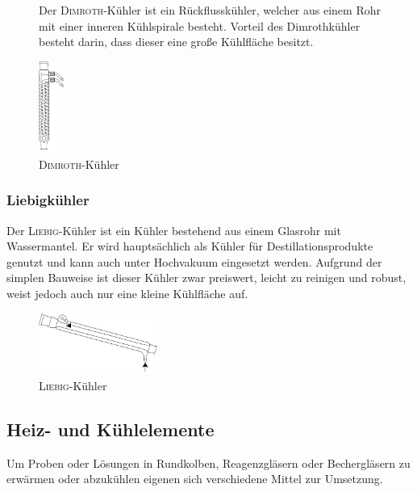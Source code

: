 \begin{figure}[h!]
	\begin{minipage}[t]{0.6\textwidth}
		\vspace{0pt}
		Der \textsc{Dimroth}-Kühler ist ein Rückflusskühler, welcher aus einem Rohr mit einer inneren Kühlspirale besteht. Vorteil des Dimrothkühler besteht darin, dass dieser eine große Kühlfläche besitzt.
	\end{minipage}
	\hfill
	\begin{minipage}[t]{0.35\textwidth}
		\vspace{0pt}
		\centering
		\includegraphics[height=3cm]{img/dimroth}
		\caption{\textsc{Dimroth}-Kühler}
		\label{fig:dimroth}
	\end{minipage}
\end{figure}
\FloatBarrier

\vspace*{-5mm}

\subsubsection*{Liebigkühler}
Der \textsc{Liebig}-Kühler ist ein Kühler bestehend aus einem Glasrohr mit Wassermantel. Er wird hauptsächlich als Kühler für Destillationsprodukte genutzt und kann auch unter Hochvakuum eingesetzt werden. Aufgrund der simplen Bauweise ist dieser Kühler zwar preiswert, leicht zu reinigen und robust, weist jedoch auch nur eine kleine Kühlfläche auf.
\begin{figure}[h!]
	\centering
	\includegraphics[width=0.35\textwidth]{img/liebigkuehler}
	\caption{\textsc{Liebig}-Kühler}
	\label{fig:liebigkuehler}
\end{figure}
\FloatBarrier

\subsection{Heiz- und Kühlelemente}
Um Proben oder Lösungen in Rundkolben, Reagenzgläsern oder Bechergläsern zu erwärmen oder abzukühlen eigenen sich verschiedene Mittel zur Umsetzung.



